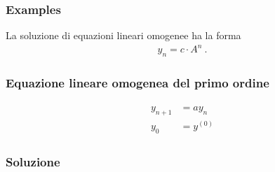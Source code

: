 \documentclass[letterpaper,10pt,italian]{jupyterBook}
\begin{document}
\subsubsection{Examples}
\label{\detokenize{ch/difference-equations:examples}}\label{\detokenize{ch/difference-equations:ode-hs-types-linear-const-ex}}
\sphinxAtStartPar
La soluzione di equazioni lineari omogenee ha la forma
\begin{equation*}
\begin{split}y_n = c \cdot A^n \ .\end{split}
\end{equation*}\subsubsection*{Equazione lineare omogenea del primo ordine}
\begin{equation*}
\begin{split}\begin{aligned}
  y_{n+1} & = a y_n \\
  y_0     & = y^{(0)}
\end{aligned}\end{split}
\end{equation*}\subsubsection*{Soluzione}
\end{document}
